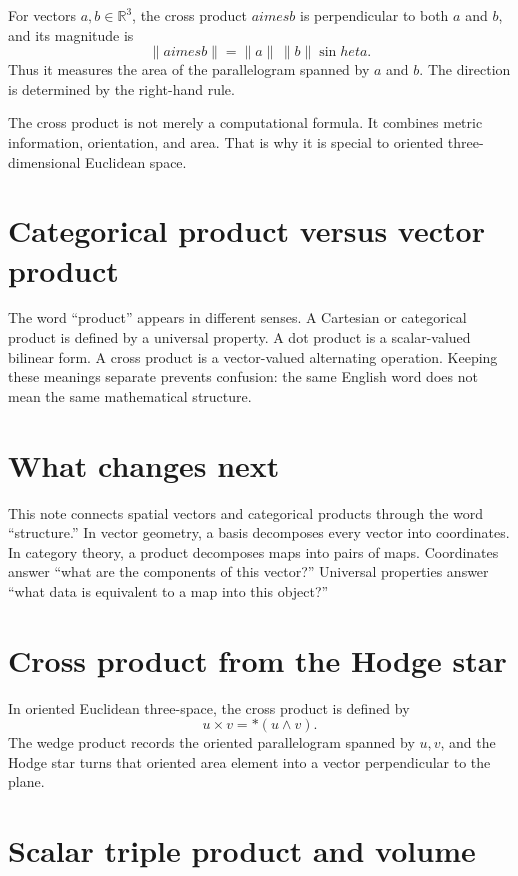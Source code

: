 For vectors \(a,b\in\mathbb R^3\), the cross product \(a	imes b\) is perpendicular to both \(a\) and \(b\), and its magnitude is
\[
  \|a	imes b\|=\|a\|\,\|b\|\sin	heta.
\]
Thus it measures the area of the parallelogram spanned by \(a\) and \(b\).  The direction is determined by the right-hand rule.

The cross product is not merely a computational formula.  It combines metric information, orientation, and area.  That is why it is special to oriented three-dimensional Euclidean space.

\section{Categorical product versus vector product}

The word ``product'' appears in different senses.  A Cartesian or categorical product is defined by a universal property.  A dot product is a scalar-valued bilinear form.  A cross product is a vector-valued alternating operation.  Keeping these meanings separate prevents confusion: the same English word does not mean the same mathematical structure.

\section{What changes next}

This note connects spatial vectors and categorical products through the word ``structure.''  In vector geometry, a basis decomposes every vector into coordinates.  In category theory, a product decomposes maps into pairs of maps.  Coordinates answer ``what are the components of this vector?''  Universal properties answer ``what data is equivalent to a map into this object?''

\section{Cross product from the Hodge star}

In oriented Euclidean three-space, the cross product is defined by
\[
  u\times v=* (u\wedge v).
\]
The wedge product records the oriented parallelogram spanned by \(u,v\), and the Hodge star turns that oriented area element into a vector perpendicular to the plane.

\section{Scalar triple product and volume}


